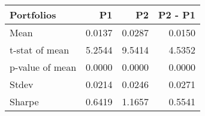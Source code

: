 \begin{tabular}{lrrr}
\toprule
Portfolios & P1 & P2 & P2 - P1 \\
\midrule
Mean & 0.0137 & 0.0287 & 0.0150 \\
t-stat of mean & 5.2544 & 9.5414 & 4.5352 \\
p-value of mean & 0.0000 & 0.0000 & 0.0000 \\
Stdev & 0.0214 & 0.0246 & 0.0271 \\
Sharpe & 0.6419 & 1.1657 & 0.5541 \\
\bottomrule
\end{tabular}
